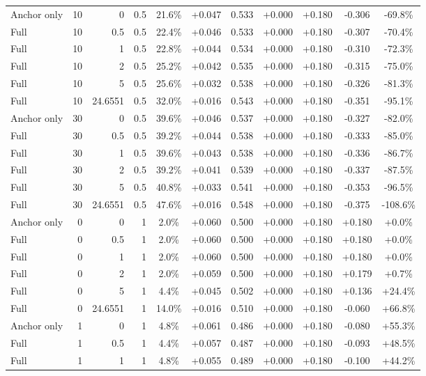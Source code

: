 \begin{table}[htbp]
\begin{tabular}{lrrrccccccc}
Anchor only & 10 & 0 & 0.5 & 21.6\% & +0.047 & 0.533 & +0.000 & +0.180 & -0.306 & -69.8\% \\
Full & 10 & 0.5 & 0.5 & 22.4\% & +0.046 & 0.533 & +0.000 & +0.180 & -0.307 & -70.4\% \\
Full & 10 & 1 & 0.5 & 22.8\% & +0.044 & 0.534 & +0.000 & +0.180 & -0.310 & -72.3\% \\
Full & 10 & 2 & 0.5 & 25.2\% & +0.042 & 0.535 & +0.000 & +0.180 & -0.315 & -75.0\% \\
Full & 10 & 5 & 0.5 & 25.6\% & +0.032 & 0.538 & +0.000 & +0.180 & -0.326 & -81.3\% \\
Full & 10 & 24.6551 & 0.5 & 32.0\% & +0.016 & 0.543 & +0.000 & +0.180 & -0.351 & -95.1\% \\
Anchor only & 30 & 0 & 0.5 & 39.6\% & +0.046 & 0.537 & +0.000 & +0.180 & -0.327 & -82.0\% \\
Full & 30 & 0.5 & 0.5 & 39.2\% & +0.044 & 0.538 & +0.000 & +0.180 & -0.333 & -85.0\% \\
Full & 30 & 1 & 0.5 & 39.6\% & +0.043 & 0.538 & +0.000 & +0.180 & -0.336 & -86.7\% \\
Full & 30 & 2 & 0.5 & 39.2\% & +0.041 & 0.539 & +0.000 & +0.180 & -0.337 & -87.5\% \\
Full & 30 & 5 & 0.5 & 40.8\% & +0.033 & 0.541 & +0.000 & +0.180 & -0.353 & -96.5\% \\
Full & 30 & 24.6551 & 0.5 & 47.6\% & +0.016 & 0.548 & +0.000 & +0.180 & -0.375 & -108.6\% \\
Anchor only & 0 & 0 & 1 & 2.0\% & +0.060 & 0.500 & +0.000 & +0.180 & +0.180 & +0.0\% \\
Full & 0 & 0.5 & 1 & 2.0\% & +0.060 & 0.500 & +0.000 & +0.180 & +0.180 & +0.0\% \\
Full & 0 & 1 & 1 & 2.0\% & +0.060 & 0.500 & +0.000 & +0.180 & +0.180 & +0.0\% \\
Full & 0 & 2 & 1 & 2.0\% & +0.059 & 0.500 & +0.000 & +0.180 & +0.179 & +0.7\% \\
Full & 0 & 5 & 1 & 4.4\% & +0.045 & 0.502 & +0.000 & +0.180 & +0.136 & +24.4\% \\
Full & 0 & 24.6551 & 1 & 14.0\% & +0.016 & 0.510 & +0.000 & +0.180 & -0.060 & +66.8\% \\
Anchor only & 1 & 0 & 1 & 4.8\% & +0.061 & 0.486 & +0.000 & +0.180 & -0.080 & +55.3\% \\
Full & 1 & 0.5 & 1 & 4.4\% & +0.057 & 0.487 & +0.000 & +0.180 & -0.093 & +48.5\% \\
Full & 1 & 1 & 1 & 4.8\% & +0.055 & 0.489 & +0.000 & +0.180 & -0.100 & +44.2\% \\

\end{tabular}
\end{table}
